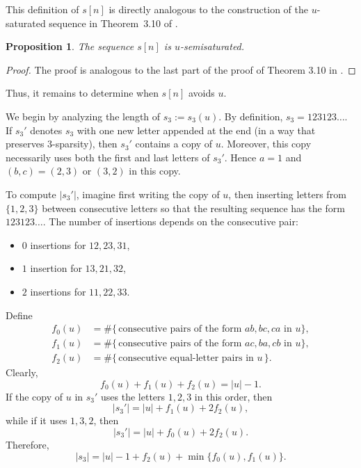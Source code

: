 \documentclass[12pt]{amsart}
\newtheorem{prop}[thm]{Proposition}
\theoremstyle{definition}
\numberwithin{equation}{section}
\numberwithin{table}{thm}
\begin{document}
This definition of $s[n]$ is directly analogous to the construction of the $u$-saturated sequence in Theorem~3.10 of \cite{ANAND2025382}.


\begin{prop}
    The sequence $s[n]$ is $u$-semisaturated.
\end{prop}
\begin{proof}
    The proof is analogous to the last part of the proof of Theorem 3.10 in \cite{ANAND2025382}.
\end{proof}
Thus, it remains to determine when $s[n]$ avoids $u$.

We begin by analyzing the length of $s_3 := s_3(u)$. By definition, $s_3 = 123123\dots$. If $s_3'$ denotes $s_3$ with one new letter appended at the end (in a way that preserves $3$-sparsity), then $s_3'$ contains a copy of $u$. Moreover, this copy necessarily uses both the first and last letters of $s_3'$. Hence $a=1$ and $(b,c)=(2,3)$ or $(3,2)$ in this copy.

To compute $|s_3'|$, imagine first writing the copy of $u$, then inserting letters from $\{1,2,3\}$ between consecutive letters so that the resulting sequence has the form $123123\dots$. The number of insertions depends on the consecutive pair:
\begin{itemize}
    \item $0$ insertions for $12,23,31$,
    \item $1$ insertion for $13,21,32$,
    \item $2$ insertions for $11,22,33$.
\end{itemize}

Define
\begin{align*}
    f_0(u) &= \#\{\,\text{consecutive pairs of the form } ab,bc,ca\text{ in $u$}\}, \\
    f_1(u) &= \#\{\,\text{consecutive pairs of the form } ac,ba,cb\text{ in $u$}\}, \\
    f_2(u) &= \#\{\,\text{consecutive equal-letter pairs in } u\,\}.
\end{align*}
Clearly,
\[
f_0(u) + f_1(u) + f_2(u) = |u|-1.
\]
If the copy of $u$ in $s_3'$ uses the letters $1,2,3$ in this order, then
\[
|s_3'| = |u| + f_1(u) + 2f_2(u),
\]
while if it uses $1,3,2$, then
\[
|s_3'| = |u| + f_0(u) + 2f_2(u).
\]
Therefore,
\begin{equation}\label{eqn: length of s_3}
    |s_3| = |u| - 1 + f_2(u) + \min\{f_0(u),f_1(u)\}.
\end{equation}
\end{document}

